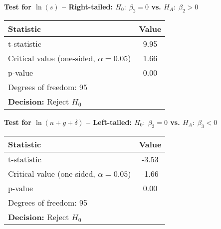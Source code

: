 \noindent\textbf{Test for $\ln(s)$ -- Right-tailed: $H_0:\;\beta_2=0$ vs. $H_A:\;\beta_2>0$}\\
\begin{tabular}{lc}
\hline
Statistic & Value \\
\hline
t-statistic & 9.95 \\
Critical value (one-sided, $\alpha=0.05$) & 1.66 \\
p-value & 0.00 \\
\hline
\multicolumn{2}{l}{Degrees of freedom: 95} \\
\multicolumn{2}{l}{\textbf{Decision:} Reject $H_0$} \\
\end{tabular}

\vspace{8pt}

\noindent\textbf{Test for $\ln(n+g+\delta)$ -- Left-tailed: $H_0:\;\beta_3=0$ vs. $H_A:\;\beta_3<0$}\\
\begin{tabular}{lc}
\hline
Statistic & Value \\
\hline
t-statistic & -3.53 \\
Critical value (one-sided, $\alpha=0.05$) & -1.66 \\
p-value & 0.00 \\
\hline
\multicolumn{2}{l}{Degrees of freedom: 95} \\
\multicolumn{2}{l}{\textbf{Decision:} Reject $H_0$} \\
\end{tabular}


